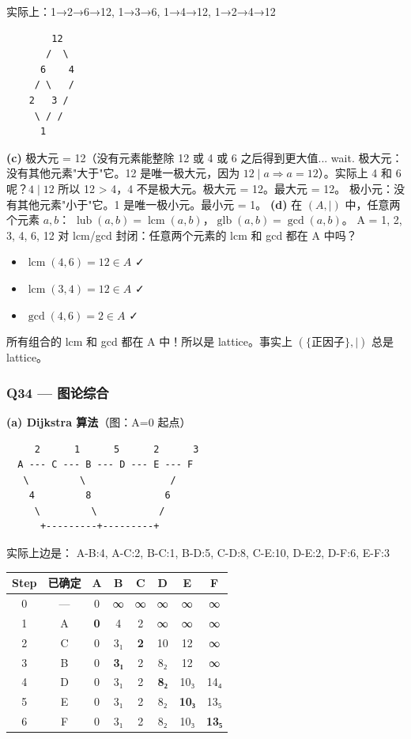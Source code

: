 \documentclass[10pt,a4paper,openany]{ctexbook}
\theoremstyle{definition}
\theoremstyle{remark}
\begin{document}
实际上：1→2→6→12, 1→3→6, 1→4→12, 1→2→4→12
{\footnotesize\begin{verbatim}
        12
       /  \
      6    4
     / \   /
    2   3 /
     \ / /
      1
\end{verbatim}}

\textbf{(c)} 极大元 = {12}（没有元素能整除 12 或 4 或 6 之后得到更大值... wait. 极大元：没有其他元素"大于"它。12 是唯一极大元，因为 $12 \mid a \Rightarrow a = 12$）。实际上 4 和 6 呢？$4 \mid 12$ 所以 12 > 4，4 不是极大元。极大元 = {12}。最大元 = 12。
极小元：没有其他元素"小于"它。1 是唯一极小元。最小元 = 1。
\textbf{(d)} 在 $(A, \mid)$ 中，任意两个元素 $a, b$：
$\operatorname{lub}(a, b) = \operatorname{lcm}(a, b)$，$\operatorname{glb}(a, b) = \gcd(a, b)$。
A = {1, 2, 3, 4, 6, 12} 对 lcm/gcd 封闭：任意两个元素的 lcm 和 gcd 都在 A 中吗？
\begin{itemize}
\item $\operatorname{lcm}(4, 6) = 12 \in A$ ✓
\item $\operatorname{lcm}(3, 4) = 12 \in A$ ✓
\item $\operatorname{gcd}(4, 6) = 2 \in A$ ✓

\end{itemize}

所有组合的 lcm 和 gcd 都在 A 中！所以是 lattice。事实上 $(\{正因子\}, \mid)$ 总是 lattice。
\vspace{-2pt}

\subsubsection{Q34 — 图论综合}

\textbf{(a) Dijkstra 算法}（图：A=0 起点）
{\footnotesize\begin{verbatim}
     2      1      5      2      3
  A --- C --- B --- D --- E --- F
   \         \               /
    4         8             6
     \         \           /
      +---------+---------+
\end{verbatim}}

实际上边是：
A-B:4, A-C:2, B-C:1, B-D:5, C-D:8, C-E:10, D-E:2, D-F:6, E-F:3
\begin{center}
\begin{tabular}{cccccccc}
\hline
Step & 已确定 & A & B & C & D & E & F \\ \hline
0 & — & 0 & ∞ & ∞ & ∞ & ∞ & ∞ \\
1 & A & \textbf{0} & 4 & 2 & ∞ & ∞ & ∞ \\
2 & C & 0 & 3₁ & \textbf{2} & 10 & 12 & ∞ \\
3 & B & 0 & \textbf{3₁} & 2 & 8₂ & 12 & ∞ \\
4 & D & 0 & 3₁ & 2 & \textbf{8₂} & 10₃ & 14₄ \\
5 & E & 0 & 3₁ & 2 & 8₂ & \textbf{10₃} & 13₅ \\
6 & F & 0 & 3₁ & 2 & 8₂ & 10₃ & \textbf{13₅} \\
\hline
\end{tabular}

\end{center}
\end{document}
